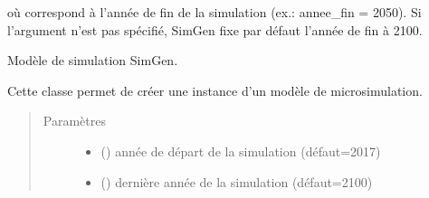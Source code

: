 \documentclass[letterpaper,10pt,french]{sphinxmanual}
\begin{document}
\begin{sphinxVerbatim}[commandchars=\\\{\}]
  
\end{sphinxVerbatim}

où  correspond à l’année de fin de la simulation (ex.: annee\_fin = 2050). Si l’argument  n’est pas spécifié, SimGen fixe par défaut l’année de fin à 2100.


\begin{fulllineitems}
\label{\detokenize{utilisation:simgen.model}}
Modèle de simulation SimGen.

Cette classe permet de créer une instance d’un modèle de microsimulation.
\begin{quote}\begin{description}
\item[{Paramètres}] \leavevmode\begin{itemize}
\item {} 
 () \textendash{} année de départ de la simulation (défaut=2017)

\item {} 
 () \textendash{} dernière année de la simulation (défaut=2100)

\end{itemize}

\end{description}\end{quote}

\end{fulllineitems}


\begin{DUlineblock}{0em}
\item[] 
\end{DUlineblock}
\end{document}
